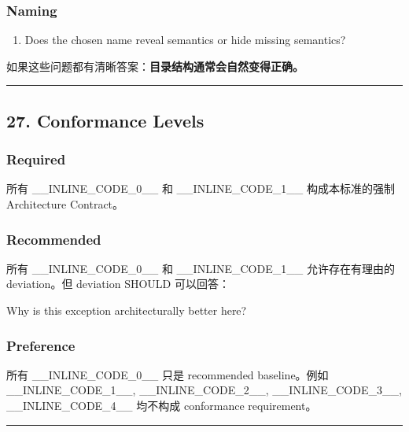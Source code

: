 \documentclass[11pt,a4paper]{article}
\begin{document}
\subsubsection{Naming}
\begin{enumerate}
  \item Does the chosen name reveal semantics or hide missing semantics?
\end{enumerate}
如果这些问题都有清晰答案：\textbf{目录结构通常会自然变得正确。}

\vspace{0.5em}\hrule\vspace{0.5em}
\subsection{27. Conformance Levels}
\subsubsection{Required}
所有 \_\_INLINE\_CODE\_0\_\_ 和 \_\_INLINE\_CODE\_1\_\_ 构成本标准的强制 Architecture Contract。

\subsubsection{Recommended}
所有 \_\_INLINE\_CODE\_0\_\_ 和 \_\_INLINE\_CODE\_1\_\_ 允许存在有理由的 deviation。但 deviation SHOULD 可以回答：

\begin{gfmBlockquote}
Why is this exception architecturally better here?
\end{gfmBlockquote}
\subsubsection{Preference}
所有 \_\_INLINE\_CODE\_0\_\_ 只是 recommended baseline。例如 \_\_INLINE\_CODE\_1\_\_, \_\_INLINE\_CODE\_2\_\_, \_\_INLINE\_CODE\_3\_\_, \_\_INLINE\_CODE\_4\_\_ 均不构成 conformance requirement。

\vspace{0.5em}\hrule\vspace{0.5em}
\end{document}
